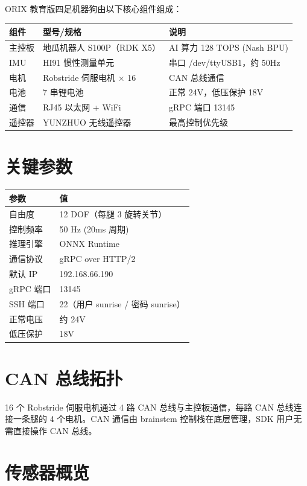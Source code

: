 \documentclass[a4paper,11pt,openany]{book}
\begin{document}
ORIX 教育版四足机器狗由以下核心组件组成：

\begin{longtable}{lll}
\toprule
组件 & 型号/规格 & 说明 \\
\midrule
\endhead
主控板 & 地瓜机器人 S100P（RDK X5） & AI 算力 128 TOPS (Nash BPU) \\
IMU & HI91 惯性测量单元 & 串口 /dev/ttyUSB1，约 50Hz \\
电机 & Robstride 伺服电机 $\times$ 16 & CAN 总线通信 \\
电池 & 7 串锂电池 & 正常 24V，低压保护 18V \\
通信 & RJ45 以太网 + WiFi & gRPC 端口 13145 \\
遥控器 & YUNZHUO 无线遥控器 & 最高控制优先级 \\
\bottomrule
\end{longtable}

\section{关键参数}

\begin{longtable}{ll}
\toprule
参数 & 值 \\
\midrule
\endhead
自由度 & 12 DOF（每腿 3 旋转关节） \\
控制频率 & 50 Hz (20ms 周期) \\
推理引擎 & ONNX Runtime \\
通信协议 & gRPC over HTTP/2 \\
默认 IP & 192.168.66.190 \\
gRPC 端口 & 13145 \\
SSH 端口 & 22（用户 sunrise / 密码 sunrise） \\
正常电压 & 约 24V \\
低压保护 & 18V \\
\bottomrule
\end{longtable}

\section{CAN 总线拓扑}

16 个 Robstride 伺服电机通过 4 路 CAN 总线与主控板通信，每路 CAN 总线连接一条腿的 4 个电机。CAN 通信由 brainstem 控制栈在底层管理，SDK 用户无需直接操作 CAN 总线。

\section{传感器概览}
\end{document}

